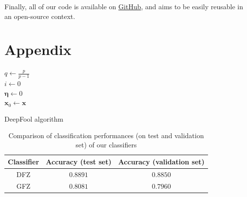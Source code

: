 \documentclass[11pt,twocolumn,letterpaper]{article}
\begin{document}
Finally, all of our code is available on \href{https://github.com/paulbarbier/adversarial-attacks-on-generative-classifiers}{GitHub}, and aims to be easily reusable in an open-source context.

\section{Appendix}
\label{sec:appendix}

\begin{algorithm}
    \SetAlgoLined
        \KwOutput{$\bm{\eta}$}
    $q \leftarrow \frac{p}{p-1}$ \\
    $i \leftarrow 0$ \\
    $\bm{\eta} \leftarrow 0$ \\
    $\bm{x}_0 \leftarrow \bm{x}$ \\
    \caption{DeepFool algorithm}
    \label{algo:deepfool}
\end{algorithm}

\begin{table}[ht]
    \centering
    \begin{tabular}{|c|c|c|}
        \hline
        \textbf{Classifier} & \textbf{Accuracy (test set)} & \textbf{Accuracy (validation set)} \\
        \hline
        DFZ & $0.8891$ & $0.8850$ \\
        \hline
        GFZ & $0.8081$ & $0.7960$ \\
        \hline
    \end{tabular}
    \caption{Comparison of classification performances (on test and validation set) of our classifiers}
    \label{tab:classification_performances}
\end{table}
\end{document}
